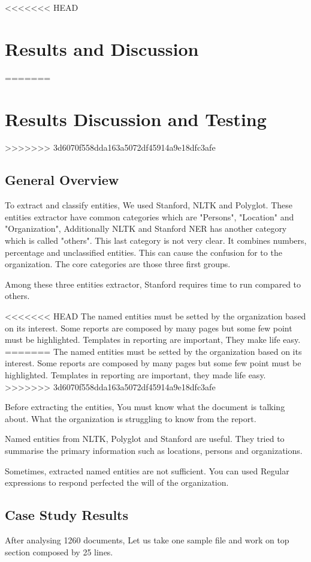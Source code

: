 <<<<<<< HEAD
\chapter{Results and Discussion}
=======
\chapter{Results Discussion and Testing}
>>>>>>> 3d6070f558dda163a5072df45914a9e18dfc3afe
\section{General Overview}
To extract and classify entities, We used Stanford, NLTK and Polyglot. These entities extractor have common categories which are "Persons", "Location" and "Organization", Additionally NLTK and Stanford NER has another category which is called "others". This last category is not very clear. It combines numbers, percentage and unclassified entities. This can cause the confusion for to the organization. The core categories are those three first groups.

Among these three entities extractor, Stanford requires time to run compared to others.

<<<<<<< HEAD
The named entities must be setted by the organization based on its interest. Some reports are composed by many pages but some few point must be highlighted. Templates in reporting are important, They make life easy.
=======
The named entities must be setted by the organization based on its interest. Some reports are composed by many pages but some few point must be highlighted. Templates in reporting are important, they made life easy.
>>>>>>> 3d6070f558dda163a5072df45914a9e18dfc3afe

Before extracting the entities, You must know what the document is  talking about. What the organization is struggling to know from the report.


Named entities from NLTK, Polyglot and Stanford are useful. They tried to summarise the primary information such as locations, persons and organizations. 

Sometimes, extracted named entities are not sufficient. You can  used Regular expressions to respond perfected the will of the organization.

\section{Case Study Results}
After analysing 1260 documents, Let us take one sample file and work on top section composed by 25 lines.

